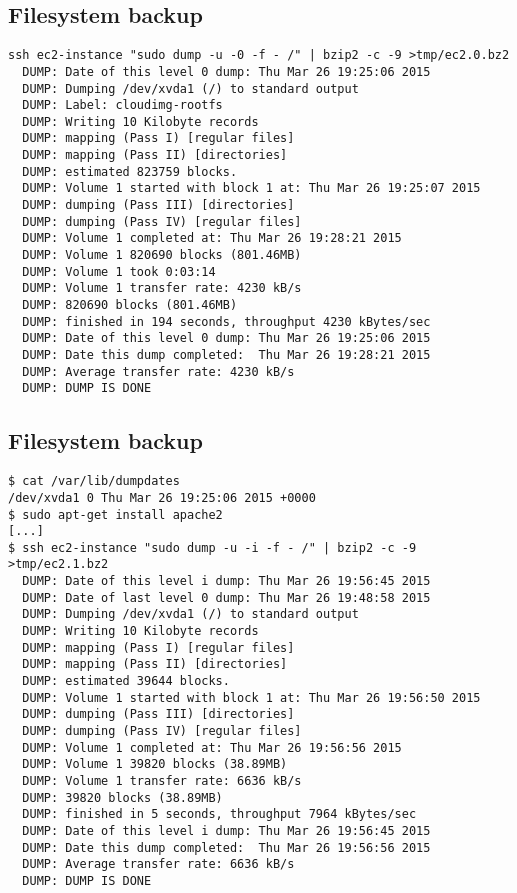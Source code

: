 \documentclass[xga]{xdvislides}
\begin{document}
\subsection{Filesystem backup}
\smallish
\begin{verbatim}
ssh ec2-instance "sudo dump -u -0 -f - /" | bzip2 -c -9 >tmp/ec2.0.bz2
  DUMP: Date of this level 0 dump: Thu Mar 26 19:25:06 2015
  DUMP: Dumping /dev/xvda1 (/) to standard output
  DUMP: Label: cloudimg-rootfs
  DUMP: Writing 10 Kilobyte records
  DUMP: mapping (Pass I) [regular files]
  DUMP: mapping (Pass II) [directories]
  DUMP: estimated 823759 blocks.
  DUMP: Volume 1 started with block 1 at: Thu Mar 26 19:25:07 2015
  DUMP: dumping (Pass III) [directories]
  DUMP: dumping (Pass IV) [regular files]
  DUMP: Volume 1 completed at: Thu Mar 26 19:28:21 2015
  DUMP: Volume 1 820690 blocks (801.46MB)
  DUMP: Volume 1 took 0:03:14
  DUMP: Volume 1 transfer rate: 4230 kB/s
  DUMP: 820690 blocks (801.46MB)
  DUMP: finished in 194 seconds, throughput 4230 kBytes/sec
  DUMP: Date of this level 0 dump: Thu Mar 26 19:25:06 2015
  DUMP: Date this dump completed:  Thu Mar 26 19:28:21 2015
  DUMP: Average transfer rate: 4230 kB/s
  DUMP: DUMP IS DONE
\end{verbatim}
\Normalsize


\subsection{Filesystem backup}
\smallish
\begin{verbatim}
$ cat /var/lib/dumpdates 
/dev/xvda1 0 Thu Mar 26 19:25:06 2015 +0000
$ sudo apt-get install apache2
[...]
$ ssh ec2-instance "sudo dump -u -i -f - /" | bzip2 -c -9 >tmp/ec2.1.bz2
  DUMP: Date of this level i dump: Thu Mar 26 19:56:45 2015
  DUMP: Date of last level 0 dump: Thu Mar 26 19:48:58 2015
  DUMP: Dumping /dev/xvda1 (/) to standard output
  DUMP: Writing 10 Kilobyte records
  DUMP: mapping (Pass I) [regular files]
  DUMP: mapping (Pass II) [directories]
  DUMP: estimated 39644 blocks.
  DUMP: Volume 1 started with block 1 at: Thu Mar 26 19:56:50 2015
  DUMP: dumping (Pass III) [directories]
  DUMP: dumping (Pass IV) [regular files]
  DUMP: Volume 1 completed at: Thu Mar 26 19:56:56 2015
  DUMP: Volume 1 39820 blocks (38.89MB)
  DUMP: Volume 1 transfer rate: 6636 kB/s
  DUMP: 39820 blocks (38.89MB)
  DUMP: finished in 5 seconds, throughput 7964 kBytes/sec
  DUMP: Date of this level i dump: Thu Mar 26 19:56:45 2015
  DUMP: Date this dump completed:  Thu Mar 26 19:56:56 2015
  DUMP: Average transfer rate: 6636 kB/s
  DUMP: DUMP IS DONE
\end{verbatim}
\Normalsize
\end{document}
